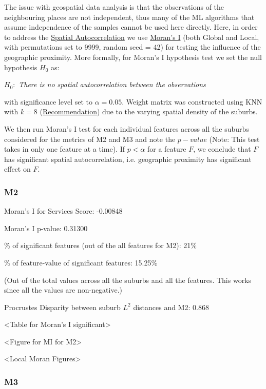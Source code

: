 \documentclass[
	a4paper, %
	10pt, %
	unnumberedsections, %
	twoside, %
]{LTJournalArticle}
\begin{document}
The issue with geospatial data analysis is that the observations of the neighbouring places are not independent, thus many of the ML algorithms that assume independence of the samples cannot be used here directly. Here, in order to address the \href{https://www.sciencedirect.com/topics/mathematics/spatial-autocorrelation}{Spatial Autocorrelation} we use \href{https://en.wikipedia.org/wiki/Moran%27s_I}{Moran's I} (both Global and Local, with permutations set to 9999, random seed = 42) for testing the influence of the geographic proximity. More formally, for Moran's I hypothesis test we set the null hypothesis $H_0$ as:

$H_0:$ \textit{There is no spatial autocorrelation between the observations}

with significance level set to $\alpha =0.05$. Weight matrix was constructed using KNN with $k=8$ (\href{https://pro.arcgis.com/en/pro-app/latest/tool-reference/spatial-statistics/spatial-autocorrelation.htm}{Recommendation}) due to the varying spatial density of the suburbs.

We then run Moran's I test for each individual features across all the suburbs considered for the metrics of M2 and M3 and note the $p-value$ (Note: This test takes in only one feature at a time). If $p<\alpha$ for a feature $F$, we conclude that $F$ has significant spatial autocorrelation, i.e. geographic proximity has significant effect on $F$.

\subsubsection{M2}\leavevmode

Moran's I for Services Score: -0.00848

Moran's I p-value: 0.31300

\% of significant features (out of the all features for M2): 21\%

\% of feature-value of significant features: 15.25\%

(Out of the total values across all the suburbs and all the features. This works since all the values are non-negative.)

Procrustes Disparity between suburb $L^2$ distances and M2: 0.868

<Table for Moran's I significant>

<Figure for MI for M2>

<Local Moran Figures>



\subsubsection{M3}\leavevmode
\end{document}
